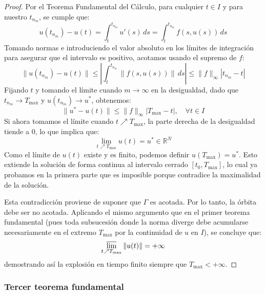 \begin{proof}
    Por el Teorema Fundamental del Cálculo, para cualquier $t \in I$ y para nuestro $t_{n_m}$, se cumple que:
    \[
        u(t_{n_m}) - u(t) = \int_t^{t_{n_m}} u'(s) \, ds = \int_t^{t_{n_m}} f(s, u(s)) \, ds
    \]
    Tomando normas e introduciendo el valor absoluto en los límites de integración para asegurar que el intervalo es positivo, acotamos usando el supremo de $f$:
    \[
        \| u(t_{n_m}) - u(t) \| \leq \left| \int_t^{t_{n_m}} \| f(s, u(s)) \| \, ds \right| \leq \| f \|_\infty | t_{n_m} - t |
    \]
    Fijando $t$ y tomando el límite cuando $m \to \infty$ en la desigualdad, dado que $t_{n_m} \to T_{\text{max}}$ y $u(t_{n_m}) \to u^*$, obtenemos:
    \[
        \| u^* - u(t) \| \leq \| f \|_\infty | T_{\text{max}} - t |, \quad \forall t \in I
    \]
    Si ahora tomamos el límite cuando $t \nearrow T_{\text{max}}$, la parte derecha de la desigualdad tiende a $0$, lo que implica que:
    \[
        \lim_{t \nearrow T_{\text{max}}} u(t) = u^* \in \mathbb{R}^N
    \]
    Como el límite de $u(t)$ existe y es finito, podemos definir $u(T_{\text{max}}) = u^*$. Esto extiende la solución de forma continua al intervalo cerrado $[t_0, T_{\text{max}}]$, lo cual ya probamos en la primera parte que es imposible porque contradice la maximalidad de la solución.
    
    Esta contradicción proviene de suponer que $\Gamma$ es acotada. Por lo tanto, la órbita debe ser no acotada. Aplicando el mismo argumento que en el primer teorema fundamental (pues toda subsucesión donde la norma diverge debe acumularse necesariamente en el extremo $T_{\text{max}}$ por la continuidad de $u$ en $I$), se concluye que:
    \[
        \varlimsup_{t \nearrow T_{\text{max}}} \| u(t) \| = +\infty
    \]
    demostrando así la explosión en tiempo finito siempre que $T_{\text{max}} < +\infty$.
\end{proof}

\subsubsection{Tercer teorema fundamental}

